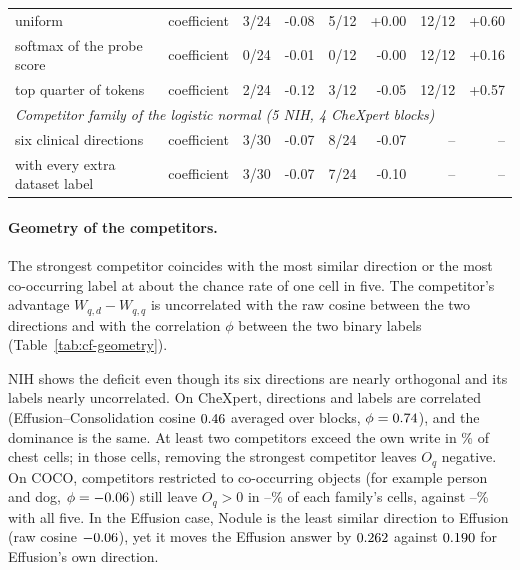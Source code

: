 \documentclass[11pt]{article}
\begin{document}
\begin{table}[tp]
{\begin{tabular}{llrrrrrr}
\quad uniform & coefficient & 3/24 & -0.08 & 5/12 & +0.00 & 12/12 & +0.60 \\
\quad softmax of the probe score & coefficient & 0/24 & -0.01 & 0/12 & -0.00 & 12/12 & +0.16 \\
\quad top quarter of tokens & coefficient & 2/24 & -0.12 & 3/12 & -0.05 & 12/12 & +0.57 \\
\midrule
\multicolumn{8}{l}{\textit{Competitor family of the logistic normal (5 NIH, 4 CheXpert blocks)}} \\
\quad six clinical directions & coefficient & 3/30 & -0.07 & 8/24 & -0.07 & -- & -- \\
\quad with every extra dataset label & coefficient & 3/30 & -0.07 & 7/24 & -0.10 & -- & -- \\
\bottomrule
\end{tabular}}
\end{table}


\paragraph{Geometry of the competitors.} The strongest competitor coincides with the most similar direction or the most co-occurring label at about the chance rate of one cell in five. The competitor's advantage $W_{q,d}-W_{q,q}$ is uncorrelated with the raw cosine between the two directions and with the correlation $\phi$ between the two binary labels (Table~\ref{tab:cf-geometry}).

NIH shows the deficit even though its six directions are nearly orthogonal and its labels nearly uncorrelated. On CheXpert, directions and labels are correlated (Effusion--Consolidation cosine $0.46$ averaged over blocks, $\phi=0.74$), and the dominance is the same. At least two competitors exceed the own write in \cfGeoTwoAbovePct\% of chest cells; in those cells, removing the strongest competitor leaves $O_q$ negative. On COCO, competitors restricted to co-occurring objects (for example person and dog, $\phi=-0.06$) still leave $O_q>0$ in \cfGeoCocoFamMinPct{}--\cfGeoCocoFamMaxPct\% of each family's cells, against \cfGeoCocoFamFullMinPct{}--\cfGeoCocoFamFullMaxPct\% with all five. In the Effusion case, Nodule is the least similar direction to Effusion (raw cosine $-0.06$), yet it moves the Effusion answer by $0.262$ against $0.190$ for Effusion's own direction.
\end{document}
